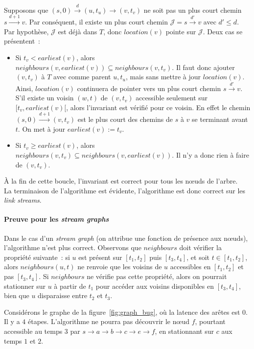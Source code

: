 \documentclass[12pt,a4paper]{article}
\begin{document}
Supposons que \((s, 0) \xrightarrow{d} (u, t_u) \rightarrow (v, t_v)\)
ne soit pas un plus court chemin \(s \xrightarrow{d+1} v\). Par
conséquent, il existe un plus court chemin
\(\mathcal{J} = s \xrightarrow{d'} v\) avec \(d' \leq d\). Par
hypothèse, \(\mathcal{J}\) est déjà dans \(T\), donc \(location(v)\)
pointe sur \(\mathcal{J}\). Deux cas se présentent~:
\begin{itemize}
\item Si \(t_v < earliest(v)\), alors
  \(neighbours(v, earliest(v)) \subseteq neighbours(v, t_v)\). Il faut
  donc ajouter \((v, t_v)\) à \(T\) avec comme parent \(u, t_u\), mais
  sans mettre à jour \(location(v)\). Ainsi, \(location(v)\)
  continuera de pointer vers un plus court chemin
  \(s \xrightarrow{d'} v\). S'il existe un voisin \((w, t)\) de
  \((v, t_v)\) accessible seulement sur \([t_v, earliest(v)[\), alors
  l'invariant est vérifié pour ce voisin. En effet le chemin
  \((s, 0) \xrightarrow{d+1} (v, t_v)\) est le plus court des chemins
  de \(s\) à \(v\) se terminant avant \(t\). On met à jour
  \(earliest(v) := t_v\).
\item Si \(t_v \geq earliest(v)\), alors \(neighbours(v, t_v)
  \subseteq neighbours(v, earliest(v))\). Il n'y a donc rien à faire
  de \((v, t_v)\).
\end{itemize}
À la fin de cette boucle, l'invariant est correct pour tous les nœuds
de l'arbre.\\

La terminaison de l'algorithme est évidente, l'algorithme est donc
correct sur les \textit{link streams}.

\paragraph{Preuve pour les \textit{stream graphs}} Dans le cas d'un
\textit{stream graph} (on attribue une fonction de présence aux
nœuds), l'algorithme n'est plus correct. Observons que \(neighbours\)
doit vérifier la propriété suivante~: si \(u\) est présent sur
\([t_1, t_2]\) puis \([t_3, t_4]\), et soit \(t \in [t_1, t_2]\),
alors \(neighbours(u, t)\) ne renvoie que les voisins de \(u\)
accessibles en \([t_1, t_2]\) et pas \([t_3, t_4]\). Si \(neighbours\)
ne vérifie pas cette propriété, alors on pourrait stationner sur \(u\)
à partir de \(t_1\) pour accéder aux voisins disponibles en
\([t_3, t_4]\), bien que \(u\) disparaisse entre \(t_2\) et \(t_3\).

Considérons le graphe de la figure~\ref{fig:graph_bug}, où la latence
des arêtes est \(0\). Il y a \(4\) étapes. L'algorithme ne pourra pas
découvrir le nœud \(f\), pourtant accessible au temps 3 par
\(s \rightarrow a \rightarrow b \rightarrow c \rightarrow e
\rightarrow f\), en stationnant sur \(c\) aux temps \(1\) et \(2\).
\end{document}

